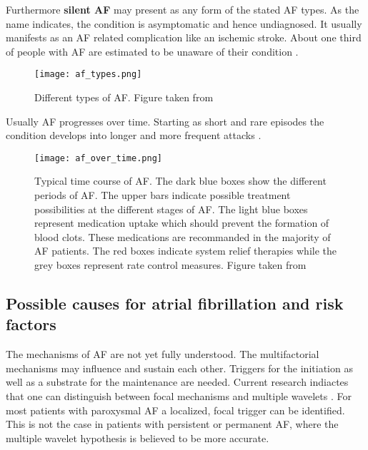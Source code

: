 \documentclass[type=dr, dr=rernat, accentcolor=tud7b,colorbacktitle, bigchapter, openright, twoside, 12pt ]{tudthesis}
\begin{document}
Furthermore \textbf{silent AF} may present as any form of the stated AF types. As the name indicates, the condition is asymptomatic and 
hence undiagnosed. It usually manifests as an AF related complication like an ischemic stroke. About one third of people with AF are 
estimated to be unaware of their condition \cite{ESC10}.

\begin{figure}[H]
\begin{center}
\texttt{[image: af\_types.png]}
\caption{Different types of AF. Figure taken from \cite{ESC10}}
\label{ecg}
\end{center}
\end{figure}

Usually AF progresses over time. Starting as short and rare episodes the condition develops into longer and more frequent attacks 
\cite{ESC10}. 

\begin{figure}[H]
\begin{center}
\texttt{[image: af\_over\_time.png]}
\caption{Typical time course of AF. The dark blue boxes show the different periods of AF. The upper bars indicate possible treatment 
possibilities at the different stages of AF. The light blue boxes represent medication uptake which should prevent the formation of blood 
clots. These medications are recommanded in the majority of AF patients. The red boxes indicate system relief therapies while the grey 
boxes represent rate control measures. Figure taken from \cite{ESC10}}
\label{afovertime}
\end{center}
\end{figure}



\subsection{Possible causes for atrial fibrillation and risk factors}
\label{AFriskfactor}

The mechanisms of AF are not yet fully understood. The multifactorial mechanisms may influence and sustain each other. Triggers for the 
initiation as well as a substrate for the maintenance are needed. Current research indiactes that one can distinguish between focal 
mechanisms and multiple wavelets \cite{CE09}. For most patients with paroxysmal AF a localized, focal trigger can be identified. This is 
not the case in patients with persistent or permanent AF, where the multiple wavelet hypothesis is believed to be more accurate.\newline
\end{document}
